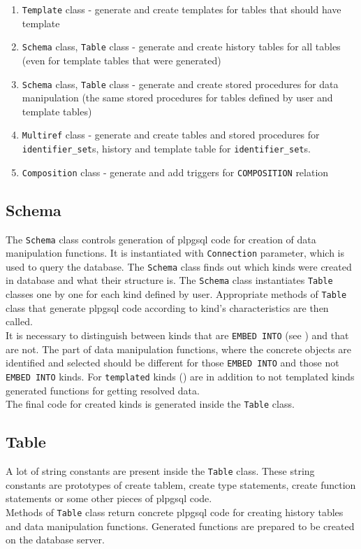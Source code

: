 \documentclass[deska]{subfiles}
\begin{document}
\begin{enumerate}
    \item {\tt Template} class - generate and create templates for tables that should have template
    \item {\tt Schema} class, {\tt Table} class - generate and create history tables for all tables (even for template tables that were generated)
    \item {\tt Schema} class, {\tt Table} class - generate and create stored procedures for data manipulation (the same stored procedures for tables defined by user and template tables)
    \item {\tt Multiref} class - generate and create tables and stored procedures for {\tt identifier\_set}s, history and template table for {\tt identifier\_set}s.
    \item {\tt Composition} class - generate and add triggers for {\tt COMPOSITION} relation
\end{enumerate}

\subsection{Schema}
The {\tt Schema} class controls generation of plpgsql code for creation of data manipulation functions. It is instantiated with {\tt Connection} parameter, which is used to query the database. 
The {\tt Schema} class finds out which kinds were created in database and what their structure is. The {\tt Schema} class instantiates {\tt Table} classes one by one for each kind defined by user. Appropriate methods of {\tt Table} class that generate plpgsql code according to kind's characteristics are then called.\\ It is necessary to distinguish between kinds that are {\tt EMBED INTO} (see ) and that are not. The part of data manipulation functions, where the concrete objects are identified and selected should be different for those {\tt EMBED INTO} and those not {\tt EMBED INTO} kinds.
For {\tt templated} kinds () are in addition to not templated kinds generated functions for getting resolved data.\\
The final code for created kinds is generated inside the {\tt Table} class.

\subsection{Table}
A lot of string constants are present inside the {\tt Table} class. These string constants are prototypes of create tablem, create type statements, create function statements or some other pieces of plpgsql code.\\
Methods of {\tt Table} class return concrete plpgsql code for creating history tables and data manipulation functions. Generated functions are prepared to be created on the database server.\\
\end{document}
